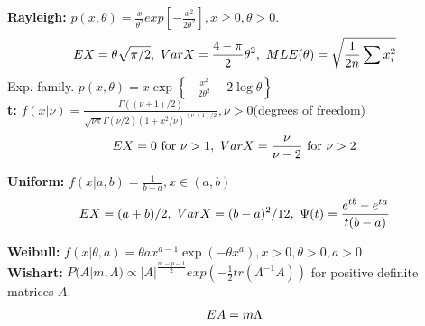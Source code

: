 \documentclass[11pt]{article}
\begin{document}
\noindent\textbf{Rayleigh:} $p(x,\theta)=\frac{x}{\theta^2}exp{\left[-\frac{x^2}{2\theta^2}\right]}, x \geq 0,\theta>0$.
\begin{eqnarray}
EX = \theta\sqrt{\pi/2}, \text{ }VarX = \frac{4-\pi}{2}\theta^2, \text{ }MLE(\theta) = \sqrt{\frac{1}{2n}\sum{x_i^2}} \notag
\end{eqnarray}
\indent Exp. family. $p(x,\theta) = x\exp{\left\{ -\frac{x^2}{2\theta^2} - 2\log{\theta} \right\}}$ \\

\noindent\textbf{t:} $f(x|\nu) = \frac{\Gamma((\nu+1)/2)}{\sqrt{\nu\pi}\Gamma(\nu/2)(1+x^2/\nu)^{(\nu+1)/2}}, \nu>0$(degrees of freedom)
\begin{eqnarray}
EX = 0\text{ for }\nu>1, \text{ }VarX = \frac{\nu}{\nu-2}\text{ for }\nu>2 \notag
\end{eqnarray}

\noindent\textbf{Uniform:} $f(x|a,b) = \frac{1}{b-a},x \in (a,b)$
\begin{eqnarray}
EX = (a+b)/2, \text{ }VarX = (b-a)^2/12,\text{ }\Psi(t) = \frac{e^{tb}-e^{ta}}{t(b-a)} \notag
\end{eqnarray}

\noindent\textbf{Weibull:} $f(x|\theta,a)=\theta a x^{a-1}\exp{(-\theta x^a)},x>0,\theta>0,a>0$ \\

\noindent\textbf{Wishart:} $P(A|m,\Lambda) \propto |A|^{\frac{m-p-1}{2}}exp\left( -\frac{1}{2}tr(\Lambda^{-1}A) \right)$ for positive definite matrices $A$.
\begin{eqnarray}
EA = m\Lambda
\notag\end{eqnarray}

\end{document}
